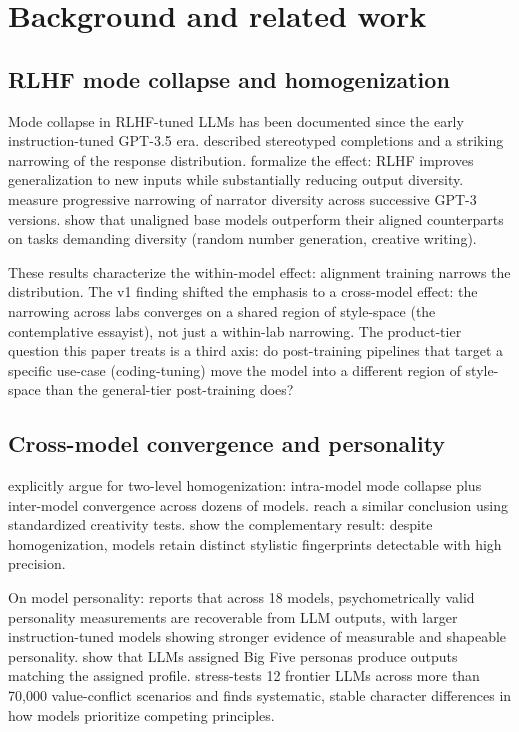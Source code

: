 \documentclass[11pt,a4paper]{article}
\begin{document}
\section{Background and related work}
\label{sec:background}

\subsection{RLHF mode collapse and homogenization}

Mode collapse in RLHF-tuned LLMs has been documented since the early instruction-tuned GPT-3.5 era. \citet{janus2022modes} described stereotyped completions and a striking narrowing of the response distribution. \citet{kirk2024rlhf} formalize the effect: RLHF improves generalization to new inputs while substantially reducing output diversity. \citet{hamilton2024modecollapse} measure progressive narrowing of narrator diversity across successive GPT-3 versions. \citet{west2025beating} show that unaligned base models outperform their aligned counterparts on tasks demanding diversity (random number generation, creative writing).

These results characterize the within-model effect: alignment training narrows the distribution. The v1 finding shifted the emphasis to a cross-model effect: the narrowing across labs converges on a shared region of style-space (the contemplative essayist), not just a within-lab narrowing. The product-tier question this paper treats is a third axis: do post-training pipelines that target a specific use-case (coding-tuning) move the model into a different region of style-space than the general-tier post-training does?

\subsection{Cross-model convergence and personality}

\citet{jiang2025hivemind} explicitly argue for two-level homogenization: intra-model mode collapse plus inter-model convergence across dozens of models. \citet{wenger2025homogeneity} reach a similar conclusion using standardized creativity tests. \citet{bitton2025fingerprints} show the complementary result: despite homogenization, models retain distinct stylistic fingerprints detectable with high precision.

On model personality: \citet{serapio2023personality} reports that across 18 models, psychometrically valid personality measurements are recoverable from LLM outputs, with larger instruction-tuned models showing stronger evidence of measurable and shapeable personality. \citet{jiang2024personallm} show that LLMs assigned Big Five personas produce outputs matching the assigned profile. \citet{zhang2025stress} stress-tests 12 frontier LLMs across more than 70{,}000 value-conflict scenarios and finds systematic, stable character differences in how models prioritize competing principles.
\end{document}
